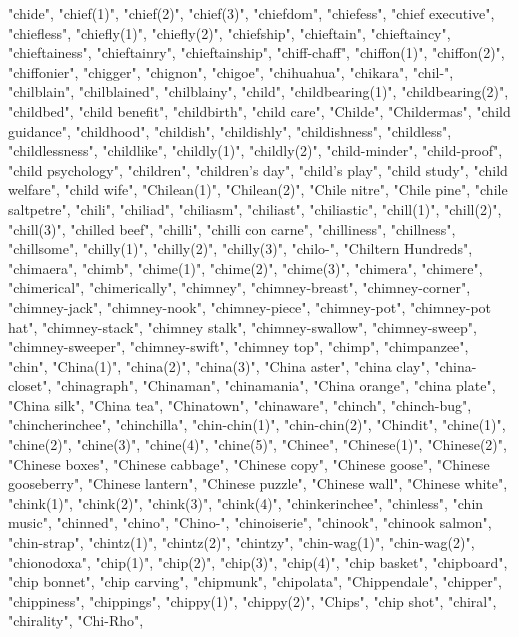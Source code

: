 "chide",
"chief(1)",
"chief(2)",
"chief(3)",
"chiefdom",
"chiefess",
"chief executive",
"chiefless",
"chiefly(1)",
"chiefly(2)",
"chiefship",
"chieftain",
"chieftaincy",
"chieftainess",
"chieftainry",
"chieftainship",
"chiff-chaff",
"chiffon(1)",
"chiffon(2)",
"chiffonier",
"chigger",
"chignon",
"chigoe",
"chihuahua",
"chikara",
"chil-",
"chilblain",
"chilblained",
"chilblainy",
"child",
"childbearing(1)",
"childbearing(2)",
"childbed",
"child benefit",
"childbirth",
"child care",
"Childe",
"Childermas",
"child guidance",
"childhood",
"childish",
"childishly",
"childishness",
"childless",
"childlessness",
"childlike",
"childly(1)",
"childly(2)",
"child-minder",
"child-proof",
"child psychology",
"children",
"children's day",
"child's play",
"child study",
"child welfare",
"child wife",
"Chilean(1)",
"Chilean(2)",
"Chile nitre",
"Chile pine",
"chile saltpetre",
"chili",
"chiliad",
"chiliasm",
"chiliast",
"chiliastic",
"chill(1)",
"chill(2)",
"chill(3)",
"chilled beef",
"chilli",
"chilli con carne",
"chilliness",
"chillness",
"chillsome",
"chilly(1)",
"chilly(2)",
"chilly(3)",
"chilo-",
"Chiltern Hundreds",
"chimaera",
"chimb",
"chime(1)",
"chime(2)",
"chime(3)",
"chimera",
"chimere",
"chimerical",
"chimerically",
"chimney",
"chimney-breast",
"chimney-corner",
"chimney-jack",
"chimney-nook",
"chimney-piece",
"chimney-pot",
"chimney-pot hat",
"chimney-stack",
"chimney stalk",
"chimney-swallow",
"chimney-sweep",
"chimney-sweeper",
"chimney-swift",
"chimney top",
"chimp",
"chimpanzee",
"chin",
"China(1)",
"china(2)",
"china(3)",
"China aster",
"china clay",
"china-closet",
"chinagraph",
"Chinaman",
"chinamania",
"China orange",
"china plate",
"China silk",
"China tea",
"Chinatown",
"chinaware",
"chinch",
"chinch-bug",
"chincherinchee",
"chinchilla",
"chin-chin(1)",
"chin-chin(2)",
"Chindit",
"chine(1)",
"chine(2)",
"chine(3)",
"chine(4)",
"chine(5)",
"Chinee",
"Chinese(1)",
"Chinese(2)",
"Chinese boxes",
"Chinese cabbage",
"Chinese copy",
"Chinese goose",
"Chinese gooseberry",
"Chinese lantern",
"Chinese puzzle",
"Chinese wall",
"Chinese white",
"chink(1)",
"chink(2)",
"chink(3)",
"chink(4)",
"chinkerinchee",
"chinless",
"chin music",
"chinned",
"chino",
"Chino-",
"chinoiserie",
"chinook",
"chinook salmon",
"chin-strap",
"chintz(1)",
"chintz(2)",
"chintzy",
"chin-wag(1)",
"chin-wag(2)",
"chionodoxa",
"chip(1)",
"chip(2)",
"chip(3)",
"chip(4)",
"chip basket",
"chipboard",
"chip bonnet",
"chip carving",
"chipmunk",
"chipolata",
"Chippendale",
"chipper",
"chippiness",
"chippings",
"chippy(1)",
"chippy(2)",
"Chips",
"chip shot",
"chiral",
"chirality",
"Chi-Rho",

